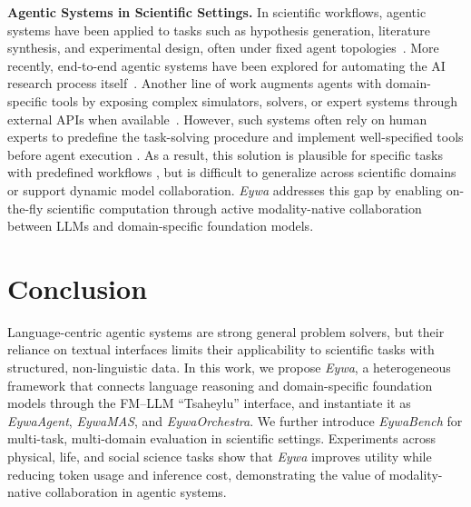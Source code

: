 \documentclass{llmxive}
\begin{document}
{\textbf{Agentic Systems in Scientific Settings.}
In scientific workflows, agentic systems have been applied to tasks such as hypothesis generation, literature synthesis, and experimental design, often under fixed agent topologies~\cite{wei2025ai,ghafarollahi2025sciagents,liu2025genomas}.
More recently, end-to-end agentic systems have been explored for automating the AI research process itself~\cite{lu2026towards}.
Another line of work augments agents with domain-specific tools by exposing complex simulators, solvers, or expert systems through external APIs when available~\cite{kim-etal-2025-mt,inoue2025drugagent}.
However, such systems often rely on human experts to predefine the task-solving procedure and implement well-specified tools before agent execution \cite{DBLP:conf/naacl/YuanSCTSRLY25}.
As a result, this solution is plausible for specific tasks with predefined workflows \cite{DBLP:journals/corr/abs-2510-04017}, but is difficult to generalize across scientific domains or support dynamic model collaboration.
\textit{Eywa} addresses this gap by enabling on-the-fly scientific computation through active modality-native collaboration between LLMs and domain-specific foundation models.

\section{Conclusion}

Language-centric agentic systems are strong general problem solvers, but their reliance on textual interfaces limits their applicability to scientific tasks with structured, non-linguistic data.
In this work, we propose \textit{Eywa}, a heterogeneous framework that connects language reasoning and domain-specific foundation models through the FM--LLM ``Tsaheylu'' interface, and instantiate it as \textit{EywaAgent}, \textit{EywaMAS}, and \textit{EywaOrchestra}.
We further introduce \textit{EywaBench} for multi-task, multi-domain evaluation in scientific settings.
Experiments across physical, life, and social science tasks show that \textit{Eywa} improves utility while reducing token usage and inference cost, demonstrating the value of modality-native collaboration in agentic systems.


}
\end{document}
